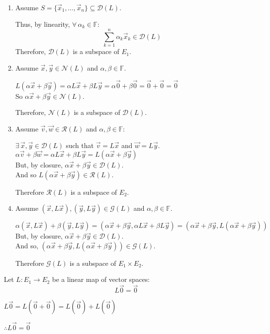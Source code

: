 \documentclass[letterpaper,12pt,fleqn]{article}
\newcommand{\vx}{\vec{x}}
\newcommand{\vy}{\vec{y}}
\newcommand{\vv}{\vec{v}}
\newcommand{\vw}{\vec{w}}
\newcommand{\vo}{\vec{0}}
\renewcommand{\d}{\mathcal{D}}
\renewcommand{\r}{\mathcal{R}}
\newcommand{\n}{\mathcal{N}}
\newcommand{\g}{\mathcal{G}}
\newcommand{\F}{\mathbb{F}}
\renewcommand{\a}{\alpha}
\renewcommand{\b}{\beta}
\begin{document}
\begin{theproof}
  \listbreak
  \begin{enumerate}
  \item Assume $S=\{\vx_1,\ldots,\vx_n\}\subseteq\d(L)$.

    Thus, by linearity, $\forall\,\a_k\in\F$:
    \[\sum_{k=1}^n\a_k\vx_k\in\d(L)\]
    Therefore, $\d(L)$ is a subspace of $E_1$.

  \item Assume $\vx,\vy\in\n(L)$ and $\a,\b\in\F$.

    $L(\a\vx+\b\vy)=\a L\vx+\b L\vy=\a\vo+\b\vo=\vo+\vo=\vo$ \\
    So $\a\vx+\b\vy\in\n(L)$.

    Therefore, $\n(L)$ is a subspace of $\d(L)$.

  \item Assume $\vv,\vw\in\r(L)$ and $\a,\b\in\F$:

    $\exists\,\vx,\vy\in\d(L)$ such that $\vv=L\vx$ and $\vw=L\vy$. \\
    $\a\vv+\b\vw=\a L\vx+\b L\vy=L(\a\vx+\b\vy)$ \\
    But, by closure, $\a\vx+\b\vy\in\d(L)$. \\
    And so $L(\a\vx+\b\vy)\in\r(L)$.

    Therefore $\r(L)$ is a subspace of $E_2$.

  \item Assume $(\vx,L\vx),(\vy,L\vy)\in\g(L)$ and $\a,\b\in\F$.

    $\a(\vx,L\vx)+\b(\vy,L\vy)=(\a\vx+\b\vy,\a L\vx+\b L\vy)=
    (\a\vx+\b\vy,L(\a\vx+\b\vy))$ \\
    But, by closure, $\a\vx+\b\vy\in\d(L)$. \\
    And so, $(\a\vx+\b\vy,L(\a\vx+\b\vy))\in\g(L)$.

    Therefore $\g(L)$ is a subspace of $E_1\times E_2$.
  \end{enumerate}
\end{theproof}

\begin{theorem}
  Let $L:E_1\to E_2$ be a linear map of vector spaces:
  \[L\vo=\vo\]
\end{theorem}

\begin{theproof}
  $L\vo=L(\vo+\vo)=L(\vo)+L(\vo)$

  $\therefore L\vo=\vo$
\end{theproof}
\end{document}
